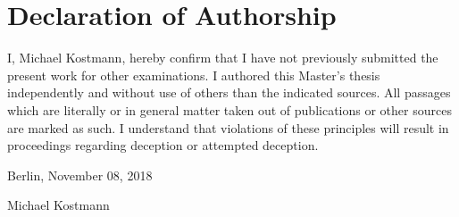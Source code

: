 
\section*{Declaration of Authorship}

I, Michael Kostmann, hereby confirm that I have not previously submitted the present work for other examinations. I authored this Master's thesis independently and without use of others than the indicated sources. All passages which are literally or in general matter taken out of publications or other sources are marked as such. I understand that violations of these principles will result in proceedings regarding deception or attempted deception.
\\\vspace{0.5cm}

\noindent Berlin, November 08, 2018 \\\vspace{0.1cm}

\noindent Michael Kostmann
